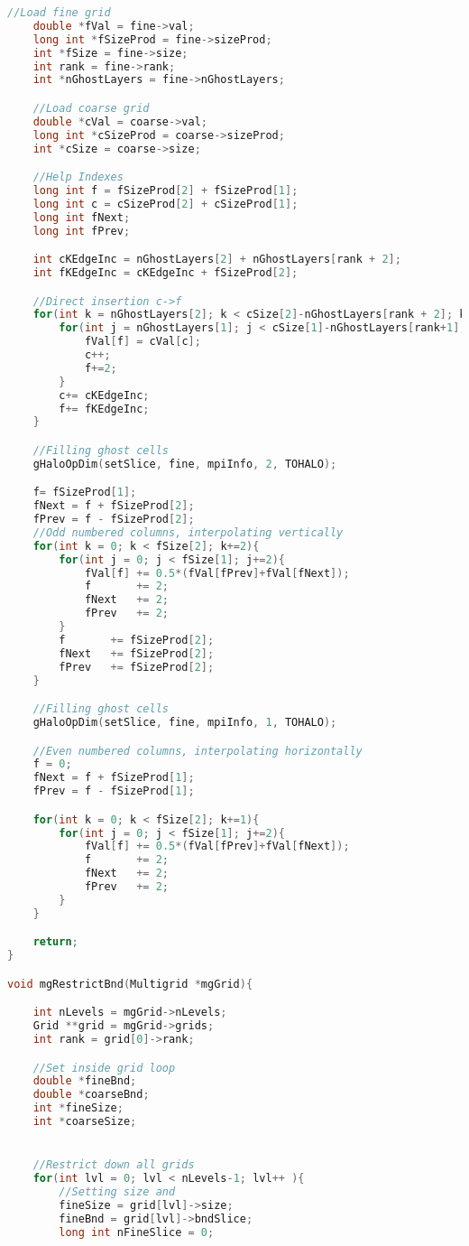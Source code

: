 \begin{lstlisting}[language=c, caption = main routine]
	//Load fine grid
	double *fVal = fine->val;
	long int *fSizeProd = fine->sizeProd;
	int *fSize = fine->size;
	int rank = fine->rank;
	int *nGhostLayers = fine->nGhostLayers;

	//Load coarse grid
	double *cVal = coarse->val;
	long int *cSizeProd = coarse->sizeProd;
	int *cSize = coarse->size;

	//Help Indexes
	long int f = fSizeProd[2] + fSizeProd[1];
	long int c = cSizeProd[2] + cSizeProd[1];
	long int fNext;
	long int fPrev;

	int cKEdgeInc = nGhostLayers[2] + nGhostLayers[rank + 2];
	int fKEdgeInc = cKEdgeInc + fSizeProd[2];

	//Direct insertion c->f
	for(int k = nGhostLayers[2]; k < cSize[2]-nGhostLayers[rank + 2]; k++){
		for(int j = nGhostLayers[1]; j < cSize[1]-nGhostLayers[rank+1]; j++){
			fVal[f] = cVal[c];
			c++;
			f+=2;
		}
		c+= cKEdgeInc;
		f+= fKEdgeInc;
	}

	//Filling ghost cells
	gHaloOpDim(setSlice, fine, mpiInfo, 2, TOHALO);

 	f= fSizeProd[1];
	fNext = f + fSizeProd[2];
	fPrev = f - fSizeProd[2];
	//Odd numbered columns, interpolating vertically
	for(int k = 0; k < fSize[2]; k+=2){
		for(int j = 0; j < fSize[1]; j+=2){
			fVal[f] += 0.5*(fVal[fPrev]+fVal[fNext]);
			f 		+= 2;
			fNext 	+= 2;
			fPrev 	+= 2;
		}
		f		+= fSizeProd[2];
		fNext 	+= fSizeProd[2];
		fPrev 	+= fSizeProd[2];
	}

	//Filling ghost cells
	gHaloOpDim(setSlice, fine, mpiInfo, 1, TOHALO);

	//Even numbered columns, interpolating horizontally
	f = 0;
	fNext = f + fSizeProd[1];
	fPrev = f - fSizeProd[1];

	for(int k = 0; k < fSize[2]; k+=1){
		for(int j = 0; j < fSize[1]; j+=2){
			fVal[f] += 0.5*(fVal[fPrev]+fVal[fNext]);
			f 		+= 2;
			fNext 	+= 2;
			fPrev 	+= 2;
		}
	}

	return;
}

void mgRestrictBnd(Multigrid *mgGrid){

	int nLevels = mgGrid->nLevels;
	Grid **grid = mgGrid->grids;
	int rank = grid[0]->rank;

	//Set inside grid loop
	double *fineBnd;
	double *coarseBnd;
	int *fineSize;
	int *coarseSize;


	//Restrict down all grids
	for(int lvl = 0; lvl < nLevels-1; lvl++ ){
		//Setting size and
		fineSize = grid[lvl]->size;
		fineBnd = grid[lvl]->bndSlice;
		long int nFineSlice = 0;


\end{lstlisting}
